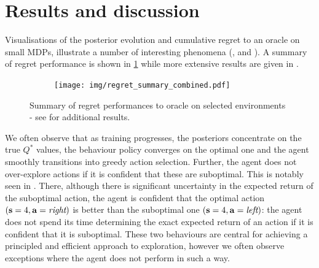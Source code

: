 \documentclass{article}
\begin{document}
\section{Results and discussion}

Visualisations of the posterior evolution and cumulative regret to an oracle on small MDPs, illustrate a number of interesting phenomena (,  and ). A summary of regret performance is shown in \cref{combined_regret_summary} while more extensive results are given in .

\begin{figure}[h!]
\centering
\begin{subfigure}{0.55\textwidth}
\texttt{[image: img/regret\_summary\_combined.pdf]}
\end{subfigure}
\captionsetup{width=0.9\linewidth}
\caption{Summary of regret performances to oracle on selected environments - see  for additional results.}\label{combined_regret_summary}
\end{figure}

We often observe that as training progresses, the posteriors concentrate on the true $Q^*$ values, the behaviour policy converges on the optimal one and the agent smoothly transitions into greedy action selection. Further, the agent does not over-explore actions if it is confident that these are suboptimal. This is notably seen in . There, although there is significant uncertainty in the expected return of the suboptimal action, the agent is confident that the optimal action $(\mathbf{s} = 4, \mathbf{a} = \textit{right})$ is better than the suboptimal one $(\mathbf{s} = 4, \mathbf{a} = \textit{left})$: the agent does not spend its time determining the exact expected return of an action if it is confident that it is suboptimal. These two behaviours are central for achieving a principled and efficient approach to exploration, however we often observe exceptions where the agent does not perform in such a way.
\end{document}
